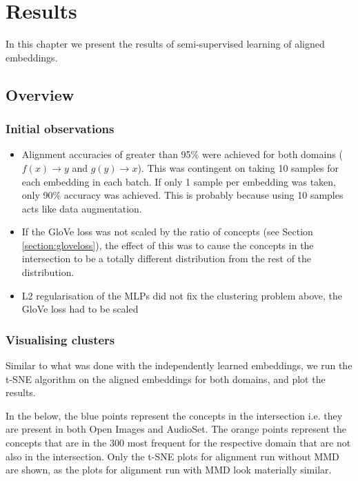 \chapter{Results}

In this chapter we present the results of semi-supervised learning of aligned embeddings.

\section{Overview}

\subsection{Initial observations}
\begin{itemize}
    \item Alignment accuracies of greater than 95\% were achieved for both domains ($f(x) \rightarrow y$ and $g(y) \rightarrow x$). This was contingent on taking 10 samples for each embedding in each batch. If only 1 sample per embedding was taken, only 90\% accuracy was achieved. This is probably because using 10 samples acts like data augmentation. 
    \item If the GloVe loss was not scaled by the ratio of concepts (see Section \ref{section:gloveloss}), the effect of this was to cause the concepts in the intersection to be a totally different distribution from the rest of the distribution.
    \item L2 regularisation of the MLPs did not fix the clustering problem above, the GloVe loss had to be scaled
\end{itemize}

\subsection{Visualising clusters}
Similar to what was done with the independently learned embeddings, we run the t-SNE algorithm on the aligned embeddings for both domains, and plot the results.

In the below, the blue points represent the concepts in the intersection i.e. they are present in both Open Images and AudioSet. The orange points represent the concepts that are in the 300 most frequent for the respective domain that are not also in the intersection. Only the t-SNE plots for alignment run without MMD are shown, as the plots for alignment run with MMD look materially similar. 

